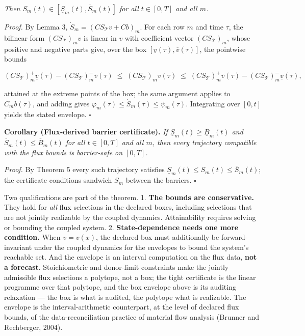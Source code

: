 \documentclass[11pt]{article}
\begin{document}
 \emph{Then \(S_m(t) \in [\underline{S}_m(t),\allowbreak{} \overline{S}_m(t)]\) for all \(t \in [0,T]\) and all \(m\).}

\emph{Proof.} By Lemma 3, \(\dot S_m =\allowbreak{} (C S_{\mathcal{T}} v +\allowbreak{} Cb)_m\). For each row \(m\) and time \(\tau\), the bilinear form \((C S_{\mathcal{T}})_m v\) is linear in \(v\) with coefficient vector \((C S_{\mathcal{T}})_m\), whose positive and negative parts give, over the box \([\underline{v}(\tau),\allowbreak{} \overline{v}(\tau)]\), the pointwise bounds 

$$(C S_{\mathcal{T}})_{m}^{+} \underline{v}(\tau) - (C S_{\mathcal{T}})_{m}^{-} \overline{v}(\tau) \;\le\; (C S_{\mathcal{T}})_m v(\tau) \;\le\; (C S_{\mathcal{T}})_{m}^{+} \overline{v}(\tau) - (C S_{\mathcal{T}})_{m}^{-} \underline{v}(\tau),$$

 attained at the extreme points of the box; the same argument applies to \(C_m b(\tau)\), and adding gives \(\varphi_m(\tau) \le \dot S_m(\tau) \le \psi_m(\tau)\). Integrating over \([0,t]\) yields the stated envelope. \(\square\)

\textbf{Corollary (Flux-derived barrier certificate).} \emph{If \(\underline{S}_m(t) \ge \underline{B}_m(t)\) and \(\overline{S}_m(t) \le \overline{B}_m(t)\) for all \(t \in [0,T]\) and all \(m\), then every trajectory compatible with the flux bounds is barrier-safe on \([0,T]\).}

\emph{Proof.} By Theorem 5 every such trajectory satisfies \(\underline{S}_m(t) \le S_m(t) \le \overline{S}_m(t)\); the certificate conditions sandwich \(S_m\) between the barriers. \(\square\)

Two qualifications are part of the theorem. 1. \textbf{The bounds are conservative.} They hold for \emph{all} flux selections in the declared boxes, including selections that are not jointly realizable by the coupled dynamics. Attainability requires solving or bounding the coupled system. 2. \textbf{State-dependence needs one more condition.} When \(v=v(x)\), the declared box must additionally be forward-invariant under the coupled dynamics for the envelopes to bound the system's reachable set. And the envelope is an interval computation on the flux data, \textbf{not a forecast}. Stoichiometric and donor-limit constraints make the jointly admissible flux selections a polytope, not a box; the tight certificate is the linear programme over that polytope, and the box envelope above is its auditing relaxation --- the box is what is audited, the polytope what is realizable. The envelope is the interval-arithmetic counterpart, at the level of declared flux bounds, of the data-reconciliation practice of material flow analysis (Brunner and Rechberger, 2004).
\end{document}
